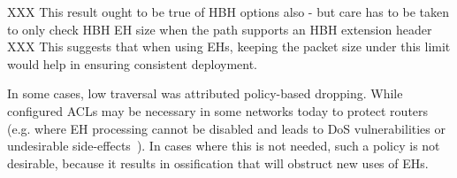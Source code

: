 \documentclass[conference]{IEEEtran}
\begin{document}
XXX This result ought to be true of HBH options also - but care has to be taken to only check HBH EH size when the path supports an HBH extension header XXX
This suggests that when using EHs, keeping the packet size under this limit would help in ensuring consistent deployment.



In some cases, low traversal was attributed policy-based dropping. While configured ACLs may be necessary in some networks today to protect routers (e.g. where EH processing cannot be disabled and leads to DoS vulnerabilities or undesirable side-effects~\cite{passive-threats}). In cases where this is not needed, such a policy is not desirable, because it results in ossification that will obstruct new uses of EHs.







\end{document}
